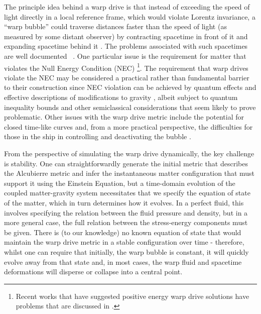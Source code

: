 \documentclass[twocolumn, numberedappendix, twocolappendix,apj, iop, a4paper]{openjournal}
\begin{document}
The principle idea behind a warp drive is that instead of exceeding the speed of light directly in a local reference frame, which would violate Lorentz invariance, a ``warp bubble'' could traverse distances faster than the speed of light (as measured by some distant observer) by contracting spacetime in front of it and expanding spacetime behind it \citep{Alcubierre:2017kqf}. The problems associated with such spacetimes are well documented ~\citep{Everett:1995nn,Hiscock:1997ya,Visser:1998ua,Loup:2001vr,Lobo:2007zb,Obousy:2007kc}. One particular issue is the requirement for matter that violates the Null Energy Condition (NEC) \citep{Olum:1998mu,Lobo:2004wq}
\footnote{Recent works that have suggested positive energy warp drive solutions \citep{Lentz:2020euv,Bobrick:2021wog,Fell:2021wak} have problems that are discussed in \citep{Santiago:2021aup}.}. The requirement that warp drives violate the NEC may be considered a practical rather than fundamental barrier to their construction since NEC violation can be achieved by quantum effects and effective descriptions of modifications to gravity \citep{Barcelo:2002bv,Kontou:2020bta}, albeit subject to quantum inequality bounds \citep{Pfenning:1997wh,Fewster:1998xn,Krasnikov:2002dq} and other semiclassical considerations \citep{Finazzi:2009jb} that seem likely to prove problematic. Other issues with the warp drive metric include the potential for closed time-like curves \citep{Everett:1995nn,Visser:1998ua} and, from a more practical perspective, the difficulties for those in the ship in controlling and deactivating the bubble \citep{Alcubierre:2017pqm}.

From the perspective of simulating the warp drive dynamically, the key challenge is stability. One can straightforwardly generate the initial metric that describes the Alcubierre metric and infer the instantaneous matter configuration that must support it using the Einstein Equation, but a time-domain evolution of the coupled matter-gravity system necessitates that we specify the equation of state of the matter, which in turn determines how it evolves. In a perfect fluid, this involves specifying the relation between the fluid pressure and density, but in a more general case, the full relation between the stress-energy components must be given. There is (to our knowledge) no known equation of state that would maintain the warp drive metric in a stable configuration over time - therefore, whilst one can require that initially, the warp bubble is constant, it will quickly evolve away from that state and, in most cases, the warp fluid and spacetime deformations will disperse or collapse into a central point.
\end{document}
